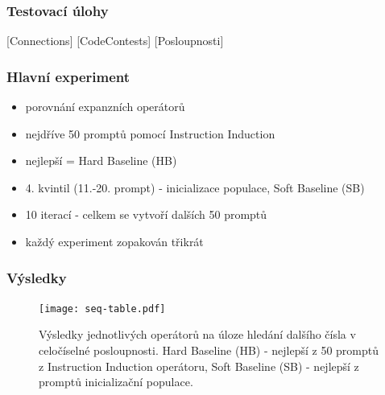 \documentclass[aspectratio=169]{beamer}
\begin{document}
\begin{frame}
	\frametitle{Testovací úlohy}
	[Connections]
	[CodeContests]
	[Posloupnosti]
\end{frame}

\begin{frame}
	\frametitle{Hlavní experiment}
	\begin{itemize}
		\item porovnání expanzních operátorů
		\item nejdříve 50 promptů pomocí Instruction Induction
		\item nejlepší = Hard Baseline (HB)
		\item 4. kvintil (11.-20. prompt) - inicializace populace, Soft Baseline (SB)
		\item 10 iterací - celkem se vytvoří dalších 50 promptů
		\item každý experiment zopakován třikrát
	\end{itemize}
\end{frame}

\begin{frame}
	\frametitle{Výsledky}
	\begin{figure}
		\texttt{[image: seq-table.pdf]}
		\caption{Výsledky jednotlivých operátorů na úloze hledání dalšího čísla v celočíselné posloupnosti. Hard Baseline (HB) - nejlepší z 50 promptů z Instruction Induction operátoru, Soft Baseline (SB) - nejlepší z promptů inicializační populace.}
	\end{figure}
\end{frame}
\end{document}
